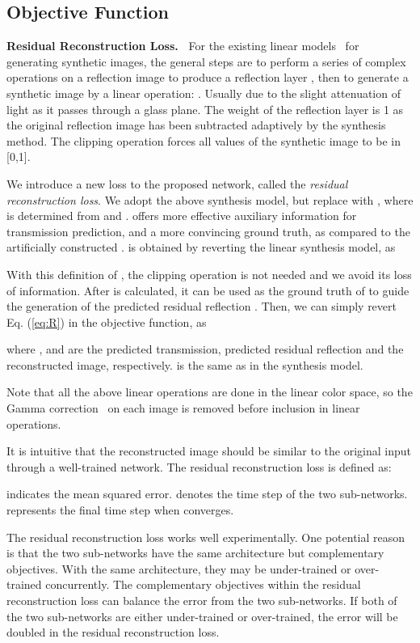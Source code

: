 \documentclass[10pt,twocolumn,letterpaper]{article}
\begin{document}
\vspace{-0.2em}
\subsection{Objective Function} \label{sec:loss}
\noindent \textbf{Residual Reconstruction Loss.~}
For the existing linear models~\cite{fan2017generic, zhang2018single} for generating synthetic images, the general steps are to perform a series of complex operations on a reflection image to produce a reflection layer , then to generate a synthetic image  by a linear operation: . 
Usually  due to the slight attenuation of light as it passes through a glass plane.  
The weight of the reflection layer  is 1 as the original reflection image has been subtracted adaptively by the synthesis method. 
The clipping operation forces all values of the synthetic image to be in [0,1]. 


We introduce a new loss to the proposed network, called the \textit{residual reconstruction loss}. We adopt the above synthesis model, but replace  with , where  is determined from  and .  offers more effective auxiliary information for transmission prediction, and a more convincing ground truth, as compared to the artificially constructed .  is obtained by reverting the linear synthesis model, as


With this definition of , the clipping operation is not needed and we avoid its loss of information.
After  is calculated, it can be used as the ground truth of  to guide the generation of the predicted residual reflection .
Then, we can simply revert Eq. (\ref{eq:R}) in the objective function, as 

where ,  and  are the predicted transmission, predicted residual reflection and the reconstructed image, respectively.  is the same as in the synthesis model. 


Note that all the above linear operations are done in the linear color space, so the Gamma correction~\cite{BULL201499} on each image is removed before inclusion in linear operations.

It is intuitive that the reconstructed image  should be similar to the original input through a well-trained network.
The residual reconstruction loss is defined as:

 indicates the mean squared error.  denotes the time step of the two sub-networks.  represents the final time step when  converges. 


The residual reconstruction loss works well experimentally. 
One potential reason is that the two sub-networks have the same architecture but complementary objectives. With the same architecture, they may be under-trained or over-trained concurrently. The complementary objectives within the residual reconstruction loss can balance the error from the two sub-networks. If both of the two sub-networks are either under-trained or over-trained, the error will be doubled in the residual reconstruction loss.
\end{document}
